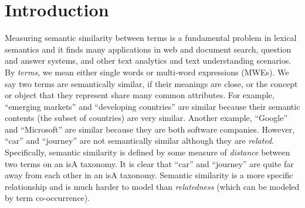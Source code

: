 \section{Introduction}

Measuring semantic similarity between terms is a fundamental problem
in lexical semantics \cite{Budanitsky:2006} and it finds many
applications in web and document search, question and answer systems,
and other text analytics and text understanding scenarios.  By {\em
  terms}, we mean either single words or multi-word expressions
(MWEs). We say two terms are semantically similar, if their meanings
are close, or the concept or object that they represent share many
common attributes.  For example, ``emerging markets'' and ``developing
countries'' are similar because their semantic contents (the subset of
countries) are very similar.  Another example, ``Google'' and
``Microsoft'' are similar because they are both software companies. %
However, ``car'' and ``journey'' are not semantically similar although
they are {\it related}. Specifically, semantic similarity is defined
by some measure of {\em distance} between two terms on an isA taxonomy.
It is clear that ``car'' and ``journey'' are quite far away from each
other in an isA taxonomy.  Semantic similarity is a more specific
relationship and is much harder to model than {\em relatedness} (which
can be modeled by term co-occurrence). %




